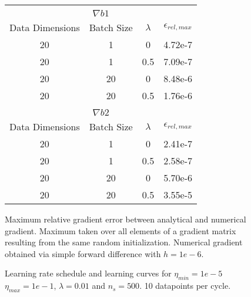 \documentclass{article}
\begin{document}
\begin{figure}[H]
\begin{tabular}{|c|c|c|c|}
    \multicolumn{4}{c}{}                                            \\

    \multicolumn{4}{c}{$\nabla b1$}                                 \\
    \hline
    Data Dimensions & Batch Size & $\lambda$ & $\epsilon_{rel,max}$ \\
    \hline
    20              & 1          & 0         & 4.72e-7              \\
    \hline
    20              & 1          & 0.5       & 7.09e-7              \\
    \hline
    20              & 20         & 0         & 8.48e-6              \\
    \hline
    20              & 20         & 0.5       & 1.76e-6              \\
    \hline

    \multicolumn{4}{c}{}                                            \\

    \multicolumn{4}{c}{$\nabla b2$}                                 \\
    \hline
    Data Dimensions & Batch Size & $\lambda$ & $\epsilon_{rel,max}$ \\
    \hline
    20              & 1          & 0         & 2.41e-7              \\
    \hline
    20              & 1          & 0.5       & 2.58e-7              \\
    \hline
    20              & 20         & 0         & 5.70e-6              \\
    \hline
    20              & 20         & 0.5       & 3.55e-5              \\
    \hline
    \end{tabular}
  \caption{Maximum relative gradient error between analytical and numerical
           gradient. Maximum taken over all elements of a gradient matrix
           resulting from the same random initialization. Numerical
           gradient obtained via simple forward difference with $h = 1e-6$.}
  \label{fig:gradients}
\end{figure}

\begin{figure}[H]
  \centering
    
  \caption{Learning rate schedule and learning curves for $\eta_{min} = 1e-5$
           $\eta_{max} = 1e-1$, $\lambda = 0.01$ and $n_s = 500$. 10 datapoints
           per cycle.}
  \label{fig:curves_default_one_cycle}
\end{figure}
\end{document}

